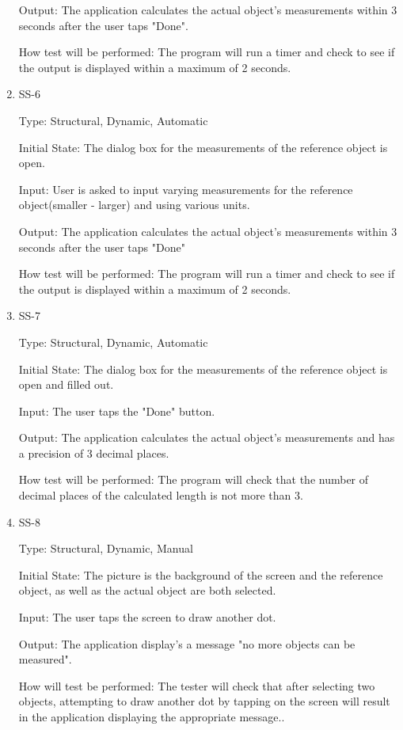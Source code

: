 \documentclass[12pt, titlepage]{article}
\begin{document}
\begin{enumerate}
Output: The application calculates the actual object's measurements within 3 seconds after the user taps "Done".

How test will be performed: The program will run a timer and check to see if the output is displayed within a maximum of 2 seconds.

\item{SS-6\\}

Type: Structural, Dynamic, Automatic

Initial State: The dialog box for the measurements of the reference object is open.

Input: User is asked to input varying measurements for the reference object(smaller - larger) and using various units.

Output: The application calculates the actual object's measurements within 3 seconds after the user taps "Done"

How test will be performed: The program will run a timer and check to see if the output is displayed within a maximum of 2 seconds.

\item{SS-7\\}

Type: Structural, Dynamic, Automatic

Initial State: The dialog box for the measurements of the reference object is open and filled out.

Input: The user taps the "Done" button.

Output: The application calculates the actual object's measurements and has a precision of 3 decimal places.

How test will be performed: The program will check that the number of decimal places of the calculated length is not more than 3.

\item{SS-8\\}

Type: Structural, Dynamic, Manual

Initial State: The picture is the background of the screen and the reference object, as well as the actual object are both selected.

Input: The user taps the screen to draw another dot.

Output: The application display's a message "no more objects can be measured".

How will test be performed: The tester will check that after selecting two objects, attempting to draw another dot by tapping on the screen will result in the application displaying the appropriate message.. 


\end{enumerate}
\end{document}
